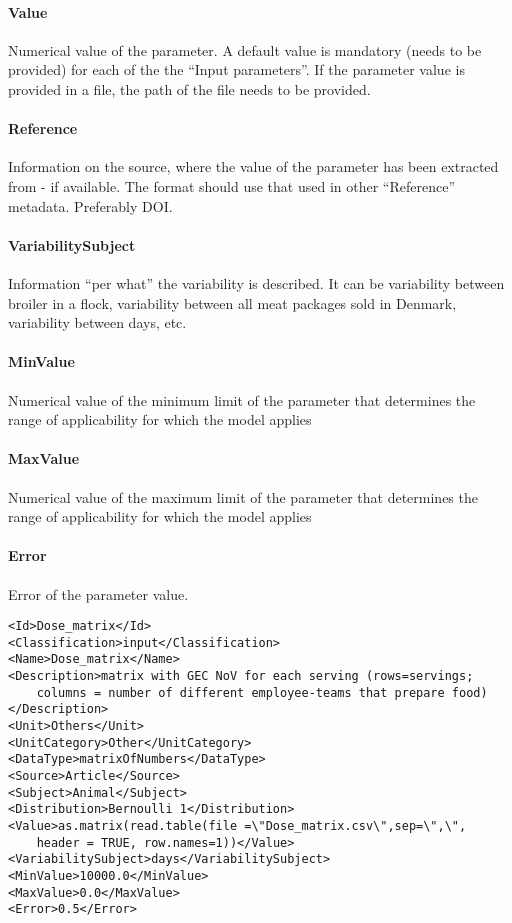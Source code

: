 \documentclass[a4paper]{report}
\begin{document}
\paragraph{Value}
Numerical value of the parameter. A default value is mandatory (needs to be provided) for each of the the ``Input parameters''. If the parameter value is provided in a file, the path of the file needs to be provided.

\paragraph{Reference}
Information on the source, where the value of the parameter has been extracted from - if available. The format should use that used in other ``Reference'' metadata. Preferably DOI.

\paragraph{VariabilitySubject}
Information ``per what'' the variability is described. It can be variability between broiler in a flock,  variability between all meat packages sold in Denmark, variability between days, etc.

\paragraph{MinValue}
Numerical value of the minimum limit of the parameter that determines the range of applicability for which the model applies

\paragraph{MaxValue}
Numerical value of the maximum limit of the parameter that determines the range of applicability for which the model applies

\paragraph{Error}
Error of the parameter value.

\begin{lstlisting}[language=RAKIP, caption={Example of Parameter}]
<Id>Dose_matrix</Id>
<Classification>input</Classification>
<Name>Dose_matrix</Name>
<Description>matrix with GEC NoV for each serving (rows=servings;
    columns = number of different employee-teams that prepare food)
</Description>
<Unit>Others</Unit>
<UnitCategory>Other</UnitCategory>
<DataType>matrixOfNumbers</DataType>
<Source>Article</Source>
<Subject>Animal</Subject>
<Distribution>Bernoulli 1</Distribution>
<Value>as.matrix(read.table(file =\"Dose_matrix.csv\",sep=\",\",
    header = TRUE, row.names=1))</Value>
<VariabilitySubject>days</VariabilitySubject>
<MinValue>10000.0</MinValue>
<MaxValue>0.0</MaxValue>
<Error>0.5</Error>
\end{lstlisting}
\end{document}
